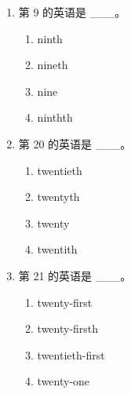 \documentclass[11pt,a4paper]{ctexart}
\begin{document}
\begin{enumerate}[leftmargin=*,itemsep=4pt]
\item 第 9 的英语是 \_\_\_。
\begin{enumerate}[label=\Alph*.,leftmargin=2em,itemsep=1pt,topsep=2pt]
\item ninth
\item nineth
\item nine
\item ninthth
\end{enumerate}
\item 第 20 的英语是 \_\_\_。
\begin{enumerate}[label=\Alph*.,leftmargin=2em,itemsep=1pt,topsep=2pt]
\item twentieth
\item twentyth
\item twenty
\item twentith
\end{enumerate}
\item 第 21 的英语是 \_\_\_。
\begin{enumerate}[label=\Alph*.,leftmargin=2em,itemsep=1pt,topsep=2pt]
\item twenty-first
\item twenty-firsth
\item twentieth-first
\item twenty-one
\end{enumerate}
\end{enumerate}
\end{document}
